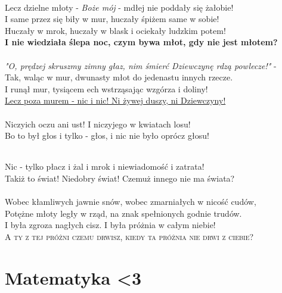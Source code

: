 \documentclass[12pt]{article}
\begin{document}
\paragraph{}

Lecz dzielne młoty - \textit{Boże mój} - mdłej nie poddały się żałobie!\\
I same przez się biły w mur, huczały śpiżem same w sobie!\\
Huczały w mrok, huczały w blask i ociekały ludzkim potem!\\
\textbf{I nie wiedziała ślepa noc, czym bywa młot, gdy nie jest młotem?}\\
\\
\textit{ "O, prędzej skruszmy zimny głaz, nim śmierć Dziewczynę rdzą powlecze!"} -\\
Tak, waląc w mur, dwunasty młot do jedenastu innych rzecze.\\
I runął mur, tysiącem ech wstrząsając wzgórza i doliny!\\
\underline{Lecz poza murem - nic i nic! Ni żywej duszy, ni Dziewczyny!}\\
\\
Niczyich oczu ani ust! I niczyjego w kwiatach losu!\\
Bo to był głos i tylko - głos, i nic nie było oprócz głosu!\\
\paragraph{}

Nic - tylko płacz i żal i mrok i niewiadomość i zatrata!\\
Takiż to świat! Niedobry świat! Czemuż innego nie ma świata?\\
\\
Wobec kłamliwych jawnie snów, wobec zmarniałych w nicość cudów,\\
Potężne młoty legły w rząd, na znak spełnionych godnie trudów.\\
I była zgroza nagłych cisz. I była próżnia w całym niebie!\\
\textsc{A ty z tej próżni czemu drwisz, kiedy ta próżnia nie drwi z ciebie?}\cite{Dziewczyna}
\paragraph{}

\newpage
\part{Matematyka \textless3}
\end{document}
